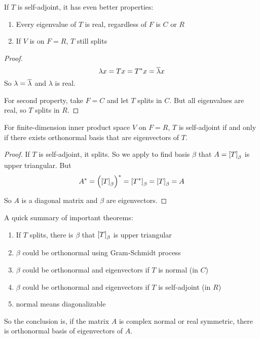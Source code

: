If $T$ is self-adjoint, it has even better properties:
\begin{enumerate}
    \item Every eigenvalue of $T$ is real, regardless of $F$ is $C$ or $R$
    \item If $V$ is on $F=R$, $T$ still splits
\end{enumerate}
\begin{proof}
    \begin{equation*}
        \lambda x = Tx = T^* x = \overline{\lambda} x
    \end{equation*}
    So $\lambda = \overline{\lambda}$ and $\lambda$ is real.
    
    For second property, take $F=C$ and let $T$ splits in $C$. But all eigenvalues are real, so $T$ splits in $R$.
\end{proof}

\begin{theorem}
    For finite-dimension inner product space $V$ on $F=R$, $T$ is self-adjoint if and only if there exists orthonormal basis that are eigenvectors of $T$.
\end{theorem}
\begin{proof}
    If $T$ is self-adjoint, it splits. So we apply  to find basis $\beta$ that $A = \coordinate{T}_\beta$ is upper triangular. But
    \begin{equation*}
        A^* = \left(\coordinate{T}_\beta\right)^* = \coordinate{T^*}_\beta = \coordinate{T}_\beta = A
    \end{equation*}
    
    So $A$ is a diagonal matrix and $\beta$ are eigenvectors.
\end{proof}

A quick summary of important theorems:
\begin{enumerate}
    \item If $T$ splits, there is $\beta$ that $\coordinate{T}_\beta$ is upper triangular
    \item $\beta$ could be orthonormal using Gram-Schmidt process
    \item $\beta$ could be orthonormal and eigenvectors if $T$ is normal (in $C$)
    \item $\beta$ could be orthonormal and eigenvectors if $T$ is self-adjoint (in $R$)
    \item normal means diagonalizable
\end{enumerate}


So the conclusion is, if the matrix $A$ is complex normal or real symmetric, there is orthonormal basis of eigenvectors of $A$.

